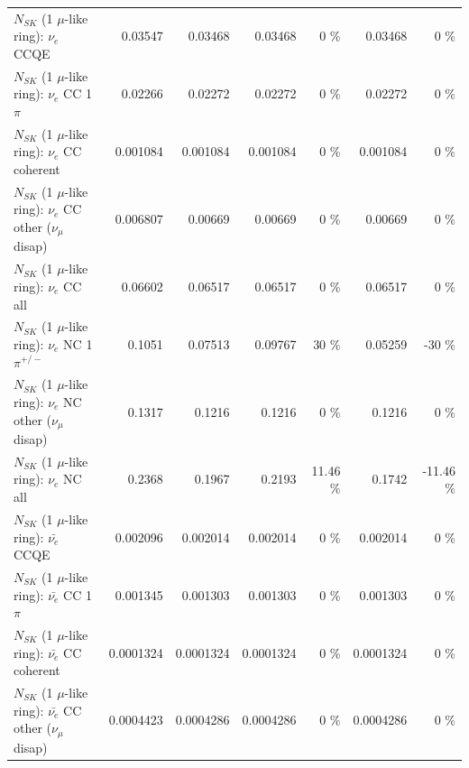 \begin{table}
\begin{tabular}{| l | r | r | r  r | r  r |}
\hline
\hline
\hline
                                      $N_{SK}$ (1 $\mu$-like ring): $\nu_e$ CCQE &         0.03547 &         0.03468 &         0.03468 &        0 \%  &         0.03468 &        0 \%  \\ 
                                 $N_{SK}$ (1 $\mu$-like ring): $\nu_e$ CC 1$\pi$ &         0.02266 &         0.02272 &         0.02272 &        0 \%  &         0.02272 &        0 \%  \\ 
                               $N_{SK}$ (1 $\mu$-like ring): $\nu_e$ CC coherent &        0.001084 &        0.001084 &        0.001084 &        0 \%  &        0.001084 &        0 \%  \\ 
                $N_{SK}$ (1 $\mu$-like ring): $\nu_e$ CC other ($\nu_\mu$ disap) &        0.006807 &         0.00669 &         0.00669 &        0 \%  &         0.00669 &        0 \%  \\ 
                                  $N_{SK}$ (1 $\mu$-like ring): $\nu_{e}$ CC all &         0.06602 &         0.06517 &         0.06517 &        0 \%  &         0.06517 &        0 \%  \\ 
\hline
                           $N_{SK}$ (1 $\mu$-like ring): $\nu_e$ NC 1$\pi^{+/-}$ &          0.1051 &         0.07513 &         0.09767 &       30 \%  &         0.05259 &      -30 \%  \\ 
                $N_{SK}$ (1 $\mu$-like ring): $\nu_e$ NC other ($\nu_\mu$ disap) &          0.1317 &          0.1216 &          0.1216 &        0 \%  &          0.1216 &        0 \%  \\ 
                                  $N_{SK}$ (1 $\mu$-like ring): $\nu_{e}$ NC all &          0.2368 &          0.1967 &          0.2193 &    11.46 \%  &          0.1742 &   -11.46 \%  \\ 
\hline
\hline
\hline
                                $N_{SK}$ (1 $\mu$-like ring): $\bar{\nu_e}$ CCQE &        0.002096 &        0.002014 &        0.002014 &        0 \%  &        0.002014 &        0 \%  \\ 
                           $N_{SK}$ (1 $\mu$-like ring): $\bar{\nu_e}$ CC 1$\pi$ &        0.001345 &        0.001303 &        0.001303 &        0 \%  &        0.001303 &        0 \%  \\ 
                         $N_{SK}$ (1 $\mu$-like ring): $\bar{\nu_e}$ CC coherent &       0.0001324 &       0.0001324 &       0.0001324 &        0 \%  &       0.0001324 &        0 \%  \\ 
          $N_{SK}$ (1 $\mu$-like ring): $\bar{\nu_e}$ CC other ($\nu_\mu$ disap) &       0.0004423 &       0.0004286 &       0.0004286 &        0 \%  &       0.0004286 &        0 \%  \\ 

\end{tabular}
\end{table}
